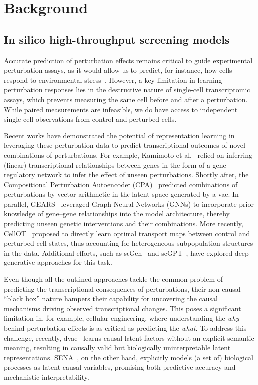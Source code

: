 \section*{Background}

\subsection*{In silico high-throughput screening models}
Accurate \insilico{} prediction of perturbation effects remains critical to guide experimental perturbation assays, as it would allow us to predict, for instance, how cells respond to environmental stress~\cite{frangieh2021multimodal}.
However, a key limitation in learning perturbation responses lies in the destructive nature of single-cell transcriptomic assays, which prevents measuring the same cell before and after a perturbation. While paired measurements are infeasible, we do have access to independent single-cell observations from control and perturbed cells.

Recent works have demonstrated the potential of representation learning in leveraging these perturbation data to predict transcriptional outcomes of novel combinations of perturbations. For example, Kamimoto et al.~\cite{kamimoto2023dissecting} relied on inferring (linear) transcriptional relationships between genes in the form of a gene regulatory network to infer the effect of unseen perturbations.
Shortly after, the Compositional Perturbation Autoencoder (CPA)~\cite{lotfollahi_predicting_2023} predicted combinations of perturbations by vector arithmetic in the latent space generated by a \gls{vae}.
In parallel, GEARS~\cite{roohani2024predicting} leveraged Graph Neural Networks (GNNs) to incorporate prior knowledge of gene--gene relationships into the model architecture, thereby predicting unseen genetic interventions and their combinations. More recently, CellOT~\cite{bunne2023learning} proposed to directly learn optimal transport maps between control and perturbed cell states, thus accounting for heterogeneous subpopulation structures in the data.
Additional efforts, such as scGen~\cite{lotfollahi2019scgen} and scGPT~\cite{cui2024scgpt}, have explored deep generative approaches for this task.

Even though all the outlined approaches tackle the common problem of predicting the transcriptional consequences of perturbations, their non-causal ``black box'' nature hampers their capability for uncovering the causal mechanisms driving observed transcriptional changes.
This poses a significant limitation in, for example, cellular engineering, where understanding the \emph{why} behind perturbation effects is as critical as predicting the \emph{what}.
To address this challenge, recently, \gls{dvae}~\cite{zhang2023identifiability} learns causal latent factors without an explicit semantic meaning, resulting in causally valid but biologically uninterpretable latent representations.
SENA~\cite{de2025interpretable}, on the other hand, explicitly models (a set of) biological processes as latent causal variables, promising both predictive accuracy and mechanistic interpretability.

